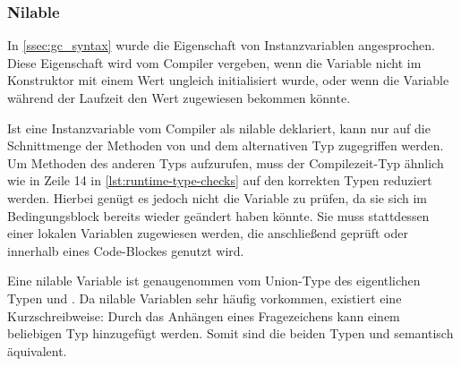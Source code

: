 \subsubsection{Nilable}
\label{sssec:gct_nilable}

In \cref{ssec:gc_syntax} wurde die Eigenschaft  von
Instanzvariablen angesprochen.  Diese Eigenschaft wird vom Compiler vergeben,
wenn die Variable nicht im Konstruktor mit einem Wert ungleich 
initialisiert wurde, oder wenn die Variable während der Laufzeit den Wert
 zugewiesen bekommen könnte.

Ist eine Instanzvariable vom Compiler als nilable deklariert, kann nur auf die
Schnittmenge der Methoden von  und dem alternativen Typ zugegriffen
werden.  Um Methoden des anderen Typs aufzurufen, muss der Compilezeit-Typ
ähnlich wie in Zeile 14 in \cref{lst:runtime-type-checks} auf den korrekten
Typen reduziert werden.  Hierbei genügt es jedoch nicht die Variable zu prüfen,
da sie sich im Bedingungsblock bereits wieder geändert haben könnte.  Sie muss
stattdessen einer lokalen Variablen zugewiesen werden, die anschließend geprüft
oder innerhalb eines  Code-Blockes genutzt wird.

Eine nilable Variable ist genaugenommen vom Union-Type des eigentlichen Typen
und .  Da nilable Variablen sehr häufig vorkommen, existiert eine
Kurzschreibweise: Durch das Anhängen eines Fragezeichens kann einem beliebigen
Typ  hinzugefügt werden.  Somit sind die beiden Typen
 und  semantisch äquivalent.
